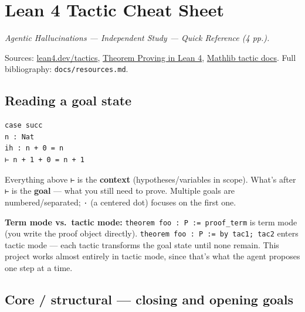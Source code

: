 \chapter{Lean 4 Tactic Cheat Sheet}
\label{ch:tactic_cheat_sheet}

\emph{Agentic Hallucinations --- Independent Study --- Quick Reference (4 pp.).}

Sources: \href{https://lean4.dev/tactics}{lean4.dev/tactics}, \href{https://leanprover.github.io/theorem_proving_in_lean4/}{Theorem Proving in Lean 4}, \href{https://leanprover-community.github.io/mathlib4_docs/tactics.html}{Mathlib tactic docs}. Full bibliography: \texttt{docs/resources.md}.

\section{Reading a goal state}

\begin{verbatim}
case succ
n : Nat
ih : n + 0 = n
⊢ n + 1 + 0 = n + 1
\end{verbatim}

Everything above \texttt{⊢} is the \textbf{context} (hypotheses/variables in scope). What's after \texttt{⊢} is the \textbf{goal} --- what you still need to prove. Multiple goals are numbered/separated; \texttt{·} (a centered dot) focuses on the first one.

\textbf{Term mode vs.\ tactic mode:} \texttt{theorem foo : P := proof\_term} is term mode (you write the proof object directly). \texttt{theorem foo : P := by tac1; tac2} enters tactic mode --- each tactic transforms the goal state until none remain. This project works almost entirely in tactic mode, since that's what the agent proposes one step at a time.

\section{Core / structural --- closing and opening goals}

